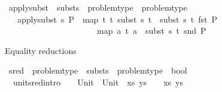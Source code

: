 \begin{isabellebody}
\isanewline
{}\isamarkupfalse%
\ apply{\isacharunderscore}{\kern0pt}subst\ {\isacharcolon}{\kern0pt}{\isacharcolon}{\kern0pt}\ {\isachardoublequoteopen}substs\ {\isasymRightarrow}\ problem{\isacharunderscore}{\kern0pt}type\ {\isasymRightarrow}\ problem{\isacharunderscore}{\kern0pt}type{\isachardoublequoteclose}\isanewline
\ \ \ {\isachardoublequoteopen}apply{\isacharunderscore}{\kern0pt}subst\ s\ P\ {\isasymequiv}\ {\isacharparenleft}{\kern0pt}map\ {\isacharparenleft}{\kern0pt}{\isasymlambda}{\isacharparenleft}{\kern0pt}t{}{\isacharcomma}{\kern0pt}\ t{}{\isacharparenright}{\kern0pt}{\isachardot}{\kern0pt}\ {\isacharparenleft}{\kern0pt}subst\ s\ t{}\ {\isasymapprox}{\isacharquery}{\kern0pt}\ subst\ s\ t{}{\isacharparenright}{\kern0pt}{\isacharparenright}{\kern0pt}\ {\isacharparenleft}{\kern0pt}fst\ P{\isacharparenright}{\kern0pt}{\isacharcomma}{\kern0pt}\isanewline
\ \ \ \ \ \ \ \ \ \ \ \ \ \ \ \ \ \ \ \ \ \ map\ {\isacharparenleft}{\kern0pt}{\isasymlambda}{\isacharparenleft}{\kern0pt}a{\isacharcomma}{\kern0pt}\ t{\isacharparenright}{\kern0pt}{\isachardot}{\kern0pt}\ {\isacharparenleft}{\kern0pt}a\ {\isasymsharp}{\isacharquery}{\kern0pt}\ {\isacharparenleft}{\kern0pt}subst\ s\ t{\isacharparenright}{\kern0pt}{\isacharparenright}{\kern0pt}{\isacharparenright}{\kern0pt}\ {\isacharparenleft}{\kern0pt}snd\ P{\isacharparenright}{\kern0pt}{\isacharparenright}{\kern0pt}{\isachardoublequoteclose}%
\begin{isamarkuptext}%
Equality reductions%
\end{isamarkuptext}\isamarkuptrue%
\isamarkupfalse%
\ s{\isacharunderscore}{\kern0pt}red\ {\isacharcolon}{\kern0pt}{\isacharcolon}{\kern0pt}\ {\isachardoublequoteopen}problem{\isacharunderscore}{\kern0pt}type\ {\isasymRightarrow}\ substs\ {\isasymRightarrow}\ problem{\isacharunderscore}{\kern0pt}type\ {\isasymRightarrow}\ bool{\isachardoublequoteclose}\ \ {\isacharparenleft}{\kern0pt}{\isachardoublequoteopen}{\isacharunderscore}{\kern0pt}\ {\isasymturnstile}\ {\isacharunderscore}{\kern0pt}\ {\isasymleadsto}\ {\isacharunderscore}{\kern0pt}\ {\isachardoublequoteclose}\ {\isacharbrackleft}{\kern0pt}{}{}{\isacharcomma}{\kern0pt}{}{}{\isacharcomma}{\kern0pt}{}{}{\isacharbrackright}{\kern0pt}\ {}{}{\isacharparenright}{\kern0pt}\isanewline
\ \ \isanewline
\ \ unit{\isacharunderscore}{\kern0pt}sred{\isacharbrackleft}{\kern0pt}intro{\isacharbang}{\kern0pt}{\isacharbrackright}{\kern0pt}{\isacharcolon}{\kern0pt}\ \ \ \ {\isachardoublequoteopen}{\isacharparenleft}{\kern0pt}{\isacharparenleft}{\kern0pt}Unit\ {\isasymapprox}{\isacharquery}{\kern0pt}\ Unit{\isacharparenright}{\kern0pt}\ {\isacharhash}{\kern0pt}\ xs{\isacharcomma}{\kern0pt}\ ys{\isacharparenright}{\kern0pt}\ {\isasymturnstile}\ {\isacharbrackleft}{\kern0pt}{\isacharbrackright}{\kern0pt}\ {\isasymleadsto}\ {\isacharparenleft}{\kern0pt}xs{\isacharcomma}{\kern0pt}\ ys{\isacharparenright}{\kern0pt}{\isachardoublequoteclose}\ {\isacharbar}{\kern0pt}\isanewline

\end{isabellebody}
